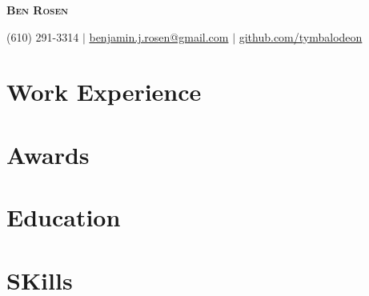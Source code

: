 \documentclass{article}
\begin{document}
\Huge{
  \textbf{
    \scshape{Ben Rosen}
  }
}

\small{(610) 291-3314}
$|$
\underline{benjamin.j.rosen@gmail.com}
$|$
\underline{github.com/tymbalodeon}

\section{Work Experience}

\section{Awards}

\section{Education}

\section{SKills}
\end{document}
